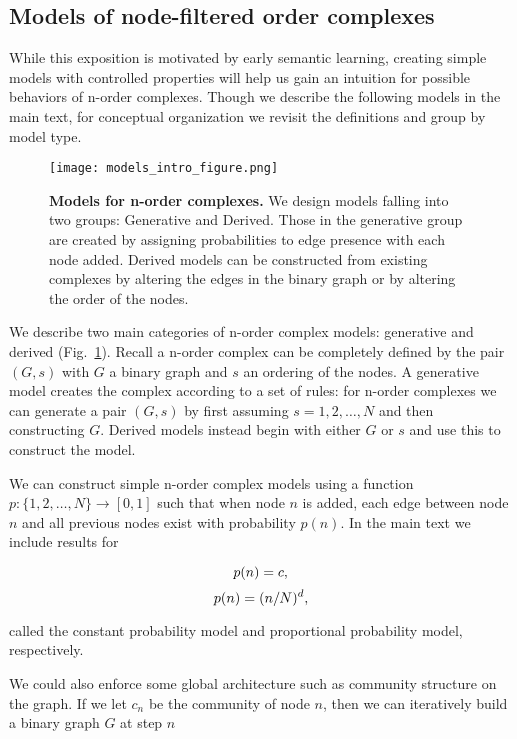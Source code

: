 \documentclass{article}
\begin{document}
\subsection*{Models of node-filtered order complexes}

While this exposition is motivated by early semantic learning, creating simple models with controlled properties will help us gain an intuition for possible behaviors of n-order complexes. Though we describe the following models in the main text, for conceptual organization we revisit the definitions and group by model type.


\begin{figure}[h]
	\centering
	\texttt{[image: models\_intro\_figure.png]}
	\caption{\textbf{Models for n-order complexes.} We design models falling into two groups: Generative and Derived. Those in the generative group are created by assigning probabilities to edge presence with each node added. Derived models can be constructed from existing complexes by altering the edges in the binary graph or by altering the order of the nodes.}
	\label{fig:sfig_models}
\end{figure}

We describe two main categories of n-order complex models: generative and derived (Fig.~\ref{fig:sfig_models}). Recall a n-order complex can be completely defined by the pair $(G,s)$ with $G$ a binary graph and $s$ an ordering of the nodes. A generative model creates the complex according to a set of rules: for n-order complexes we can generate a pair $(G,s)$ by first assuming $s = 1, 2, \dots, N$ and then constructing $G$. Derived models instead begin with either $G$ or $s$ and use this to construct the model.

We can construct simple n-order complex models using a function $p:\{1,2, \dots, N\} \rightarrow [0,1]$ such that when node $n$ is added, each edge between node $n$ and all previous nodes exist with probability $p(n)$. In the main text we include results for

\begin{equation}
p(n) = c\\,
\end{equation}
\begin{equation}
p(n) = (n/N)^d\\,
\end{equation}

called the constant probability model and proportional probability model, respectively.

We could also enforce some global architecture such as community structure on the graph. If we let $c_n$ be the community of node $n$, then we can iteratively build a binary graph $G$ at step $n$
\end{document}
